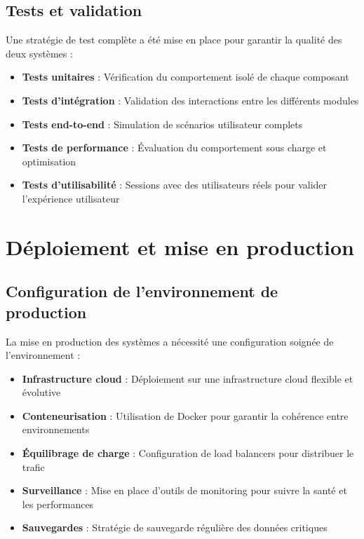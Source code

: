 \subsection{Tests et validation}

Une stratégie de test complète a été mise en place pour garantir la qualité des deux systèmes :

\begin{itemize}
  \item \textbf{Tests unitaires} : Vérification du comportement isolé de chaque composant
  
  \item \textbf{Tests d'intégration} : Validation des interactions entre les différents modules
  
  \item \textbf{Tests end-to-end} : Simulation de scénarios utilisateur complets
  
  \item \textbf{Tests de performance} : Évaluation du comportement sous charge et optimisation
  
  \item \textbf{Tests d'utilisabilité} : Sessions avec des utilisateurs réels pour valider l'expérience utilisateur
\end{itemize}

\section{Déploiement et mise en production}

\subsection{Configuration de l'environnement de production}

La mise en production des systèmes a nécessité une configuration soignée de l'environnement :

\begin{itemize}
  \item \textbf{Infrastructure cloud} : Déploiement sur une infrastructure cloud flexible et évolutive
  
  \item \textbf{Conteneurisation} : Utilisation de Docker pour garantir la cohérence entre environnements
  
  \item \textbf{Équilibrage de charge} : Configuration de load balancers pour distribuer le trafic
  
  \item \textbf{Surveillance} : Mise en place d'outils de monitoring pour suivre la santé et les performances
  
  \item \textbf{Sauvegardes} : Stratégie de sauvegarde régulière des données critiques
\end{itemize}

